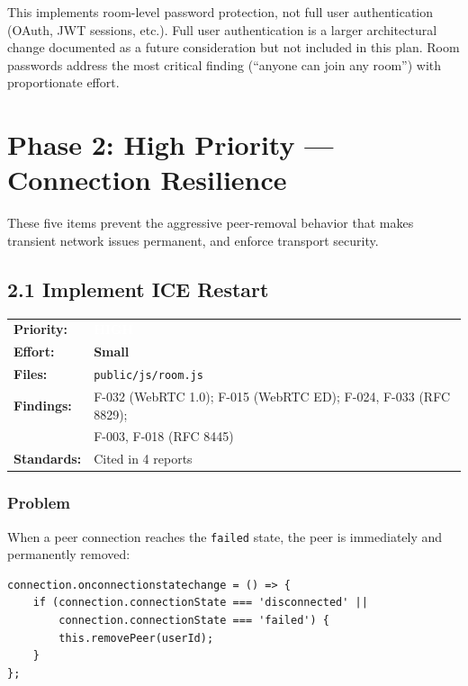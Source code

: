 \documentclass[11pt,letterpaper]{article}
\newcommand{\prihigh}{\colorbox{major}{\textcolor{white}{\small\textbf{HIGH}}}}
\newcommand{\effsmall}{\colorbox{compliant!30}{\small\textbf{Small}}}
\begin{document}
This implements room-level password protection, not full user authentication (OAuth, JWT sessions, etc.). Full user authentication is a larger architectural change documented as a future consideration but not included in this plan. Room passwords address the most critical finding (``anyone can join any room'') with proportionate effort.

\newpage

\section{Phase 2: High Priority --- Connection Resilience}

These five items prevent the aggressive peer-removal behavior that makes transient network issues permanent, and enforce transport security.

\subsection{2.1 Implement ICE Restart}

\begin{tabular}{ll}
\textbf{Priority:} & \prihigh \\
\textbf{Effort:} & \effsmall \\
\textbf{Files:} & \texttt{public/js/room.js} \\
\textbf{Findings:} & F-032 (WebRTC 1.0); F-015 (WebRTC ED); F-024, F-033 (RFC 8829); \\
& F-003, F-018 (RFC 8445) \\
\textbf{Standards:} & Cited in 4 reports \\
\end{tabular}

\subsubsection{Problem}

When a peer connection reaches the \texttt{failed} state, the peer is immediately and permanently removed:

\begin{verbatim}
connection.onconnectionstatechange = () => {
    if (connection.connectionState === 'disconnected' ||
        connection.connectionState === 'failed') {
        this.removePeer(userId);
    }
};
\end{verbatim}
\end{document}
